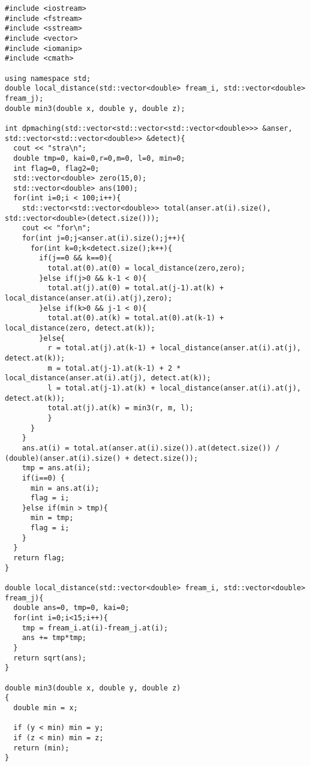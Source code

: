\documentclass[dvipdfmx]{jsarticle}
\begin{document}
\begin{lstlisting}[caption=作成したプログラム,label=huga]
#include <iostream>
#include <fstream>
#include <sstream>
#include <vector>
#include <iomanip>
#include <cmath>

using namespace std;
double local_distance(std::vector<double> fream_i, std::vector<double> fream_j);
double min3(double x, double y, double z);

int dpmaching(std::vector<std::vector<std::vector<double>>> &anser, std::vector<std::vector<double>> &detect){
  cout << "stra\n";
  double tmp=0, kai=0,r=0,m=0, l=0, min=0;
  int flag=0, flag2=0;
  std::vector<double> zero(15,0);
  std::vector<double> ans(100);
  for(int i=0;i < 100;i++){
    std::vector<std::vector<double>> total(anser.at(i).size(), std::vector<double>(detect.size()));
    cout << "for\n";
    for(int j=0;j<anser.at(i).size();j++){
      for(int k=0;k<detect.size();k++){
        if(j==0 && k==0){
          total.at(0).at(0) = local_distance(zero,zero);
        }else if(j>0 && k-1 < 0){
          total.at(j).at(0) = total.at(j-1).at(k) + local_distance(anser.at(i).at(j),zero);
        }else if(k>0 && j-1 < 0){
          total.at(0).at(k) = total.at(0).at(k-1) + local_distance(zero, detect.at(k));
        }else{
          r = total.at(j).at(k-1) + local_distance(anser.at(i).at(j), detect.at(k));
          m = total.at(j-1).at(k-1) + 2 * local_distance(anser.at(i).at(j), detect.at(k));
          l = total.at(j-1).at(k) + local_distance(anser.at(i).at(j), detect.at(k));
          total.at(j).at(k) = min3(r, m, l);
          }
      }
    }
    ans.at(i) = total.at(anser.at(i).size()).at(detect.size()) / (double)(anser.at(i).size() + detect.size());
    tmp = ans.at(i);
    if(i==0) {
      min = ans.at(i);
      flag = i;
    }else if(min > tmp){
      min = tmp;
      flag = i;
    }
  }
  return flag;
}

double local_distance(std::vector<double> fream_i, std::vector<double> fream_j){
  double ans=0, tmp=0, kai=0;
  for(int i=0;i<15;i++){
    tmp = fream_i.at(i)-fream_j.at(i);
    ans += tmp*tmp;
  }
  return sqrt(ans);
}

double min3(double x, double y, double z)
{
  double min = x;

  if (y < min) min = y;
  if (z < min) min = z;
  return (min);
}



\end{lstlisting}
\end{document}
